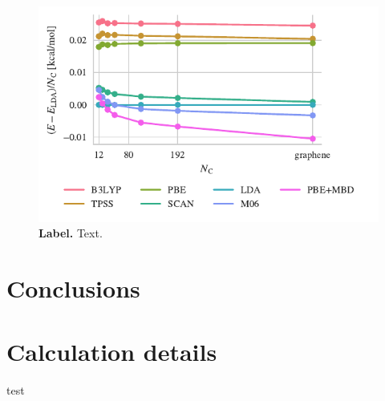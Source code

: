 \begin{figure}
\centering
\includegraphics{../media/flakes}
\caption{\textbf{Label.}
Text.
\label{fig:flakes}
}
\end{figure}

\section{Conclusions}

\section{Calculation details}

test
